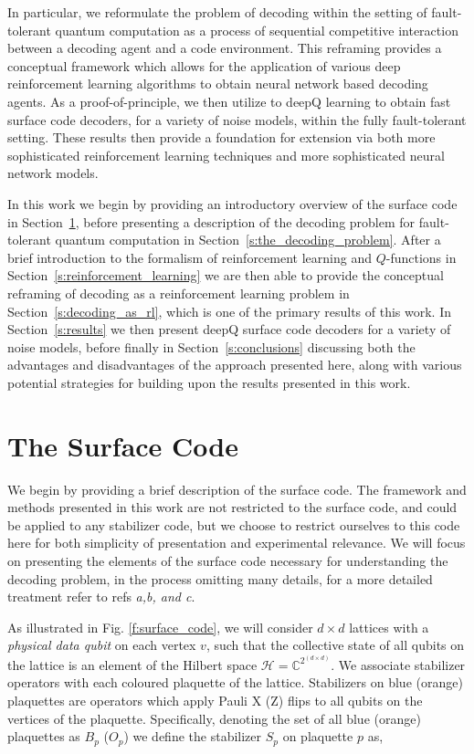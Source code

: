 \documentclass[twocolumn,preprintnumbers,amsmath,amssymb,notitlepage,nofootinbib,longbibliography,superscriptaddress,aps,pra,10pt]{revtex4-1}
\begin{document}
	In particular, we reformulate the problem of decoding within the setting of fault-tolerant quantum computation as a process of sequential competitive interaction between a decoding agent and a code environment.
	This reframing provides a conceptual framework which allows for the application of various deep reinforcement learning algorithms to obtain neural network based decoding agents.
	As a proof-of-principle, we then utilize to deepQ learning to obtain fast surface code decoders, for a variety of noise models, within the fully fault-tolerant setting.
	These results then provide a foundation for extension via both more sophisticated reinforcement learning techniques and more sophisticated neural network models.

	In this work we begin by providing an introductory overview of the surface code in Section~\ref{s:the_surface_code}, before presenting a description of the decoding problem for fault-tolerant quantum computation in Section~\ref{s:the_decoding_problem}.
	After a brief introduction to the formalism of reinforcement learning and $Q$-functions in Section~\ref{s:reinforcement_learning} we are then able to provide the conceptual reframing of decoding as a reinforcement learning problem in Section~\ref{s:decoding_as_rl}, which is one of the primary results of this work.
	In Section~\ref{s:results} we then present deepQ surface code decoders for a variety of noise models, before finally in Section~\ref{s:conclusions} discussing both the advantages and disadvantages of the approach presented here, along with various potential strategies for building upon the results presented in this work.

\section{The Surface Code}\label{s:the_surface_code}

	    We begin by providing a brief description of the surface code. 
        The framework and methods presented in this work are not restricted to the surface code, and could be applied to any stabilizer code, but we choose to restrict ourselves to this code here for both simplicity of presentation and experimental relevance. 
        We will focus on presenting the elements of the surface code necessary for understanding the decoding problem, in the process omitting many details, for a more detailed treatment refer to refs \textit{a,b, and c}.

        As illustrated in Fig. \ref{f:surface_code}, we will consider $d\times d$ lattices with a \textit{physical data qubit} on each vertex $v$, such that the collective state of all qubits on the lattice is an element of the Hilbert space $\mathcal{H} = \mathbb{C}^{2^{(d\times d)}}$. 
        We associate stabilizer operators with each coloured plaquette of the lattice.
        Stabilizers on blue (orange) plaquettes are operators which apply Pauli X (Z) flips to all qubits on the vertices of the plaquette. 
        Specifically, denoting the set of all blue (orange) plaquettes as $B_p$ ($O_p$) we define the stabilizer $S_p$ on plaquette $p$ as,
\end{document}
